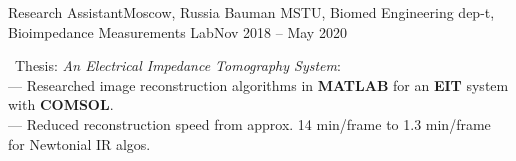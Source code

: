 \resumeSubheading
{Research Assistant}{Moscow, Russia}
{Bauman MSTU, Biomed Engineering dep-t, Bioimpedance Measurements Lab}{Nov 2018 -- May 2020}
\begin{itemize}[leftmargin=0in, label={}]
    \small{\item{
        {\textbullet \ Thesis: \textit{An Electrical Impedance Tomography System}:}\\
        {— Researched image reconstruction algorithms in \textbf{MATLAB} for an \textbf{EIT} system with \textbf{COMSOL}.}\\
        {— Reduced reconstruction speed from approx. 14 min/frame to 1.3 min/frame for Newtonial IR algos.}\\
    }}
\end{itemize}